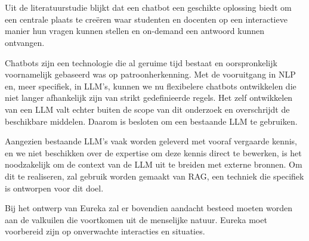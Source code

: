 \section{}%
\label{sec:besluit}

Uit de literatuurstudie blijkt dat een chatbot een geschikte oplossing biedt om een centrale plaats te creëren waar studenten en docenten op een interactieve manier hun vragen kunnen stellen en on-demand een antwoord kunnen ontvangen.

Chatbots zijn een technologie die al geruime tijd bestaat en oorspronkelijk voornamelijk gebaseerd was op patroonherkenning. Met de vooruitgang in NLP en, meer specifiek, in LLM's, kunnen we nu flexibelere chatbots ontwikkelen die niet langer afhankelijk zijn van strikt gedefinieerde regels. Het zelf ontwikkelen van een LLM valt echter buiten de scope van dit onderzoek en overschrijdt de beschikbare middelen. Daarom is besloten om een bestaande LLM te gebruiken.

Aangezien bestaande LLM's vaak worden geleverd met vooraf vergaarde kennis, en we niet beschikken over de expertise om deze kennis direct te bewerken, is het noodzakelijk om de context van de LLM uit te breiden met externe bronnen. Om dit te realiseren, zal gebruik worden gemaakt van RAG, een techniek die specifiek is ontworpen voor dit doel.

Bij het ontwerp van Eureka zal er bovendien aandacht besteed moeten worden aan de valkuilen die voortkomen uit de menselijke natuur. Eureka moet voorbereid zijn op onverwachte interacties en situaties.



